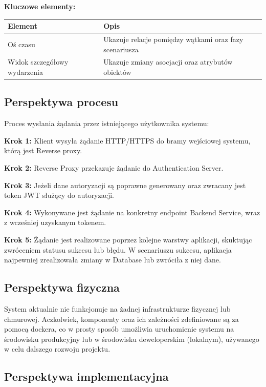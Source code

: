 \textbf{Kluczowe elementy:}
\begin{table}[H]
    \centering
    \begin{tabular}{|l|p{10cm}|}
        \hline
        \textbf{Element} & \textbf{Opis} \\
        \hline
        Oś czasu & Ukazuje relacje pomiędzy wątkami oraz fazy scenariusza \\
        \hline
        Widok szczegółowy wydarzenia & Ukazuje zmiany asocjacji oraz atrybutów obiektów \\
        \hline
    \end{tabular}
\end{table}

\subsection{Perspektywa procesu}

Proces wysłania żądania przez istniejącego użytkownika systemu:

\textbf{Krok 1:} Klient wysyła żądanie HTTP/HTTPS do bramy wejściowej systemu, którą jest Reverse proxy. 

\textbf{Krok 2:} Reverse Proxy przekazuje żądanie do Authentication Server. 

\textbf{Krok 3:} Jeżeli dane autoryzacji są poprawne generowany oraz zwracany jest token JWT służący do autoryzacji. 

\textbf{Krok 4:} Wykonywane jest żądanie na konkretny endpoint Backend Service, wraz z wcześniej uzyskanym tokenem.

\textbf{Krok 5:} Żądanie jest realizowane poprzez kolejne warstwy aplikacji, skuktując zwróceniem statusu sukcesu lub błędu. 
W scenariuszu sukcesu, aplikacja najpewniej zrealizowała zmiany w Database lub zwróciła z niej dane.


\subsection{Perspektywa fizyczna}

System aktualnie nie funkcjonuje na żadnej infrastrukturze fizycznej lub chmurowej. Aczkolwiek, komponenty oraz ich zależności
zdefiniowane są za pomocą dockera, co w prosty sposób umożliwia uruchomienie systemu na środowisku produkcyjny lub w środowisku
deweloperskim (lokalnym), używanego w celu dalszego rozwoju projektu.

\subsection{Perspektywa implementacyjna}

